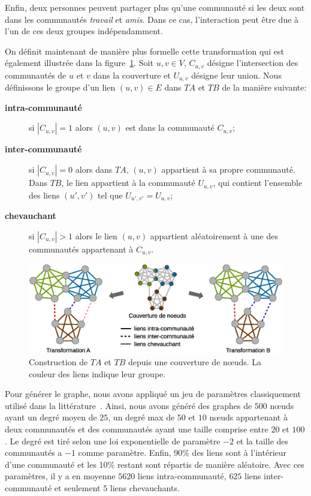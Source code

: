 Enfin, deux personnes peuvent partager plus qu'une communauté si les deux sont dans les communautés \emph{travail} et \emph{amis}.
Dans ce cas, l'interaction peut être due à l'un de ces deux groupes indépendamment.

On définit maintenant de manière plus formelle cette transformation qui est également illustrée dans la figure~\ref{fig:Trans}.
Soit $u,v \in V$, $C_{u,v}$ désigne l'intersection des communautés de $u$ et $v$ dans la couverture et $U_{u,v}$ désigne leur union.
Nous définissons le groupe d'un lien $(u,v) \in E$ dans $TA$ et $TB$ de la manière suivante:
\begin{description}
\item[\textbf{intra-communauté}] si $|C_{u,v}| = 1$ alors $(u,v)$ est dans la communauté $C_{u,v}$;
\item[\textbf{inter-communauté}] si $|C_{u,v}| = 0$ alors dans $TA$, $(u,v)$ appartient à sa propre communauté.
Dans $TB$, le lien appartient à la communauté $U_{u,v}$, qui contient l'ensemble des liens $(u',v')$ tel que $U_{u',v'}=U_{u,v}$;
\item[\textbf{chevauchant}] si $|C_{u,v}| > 1$ alors le lien $(u,v)$ appartient aléatoirement à une des communautés appartenant à $C_{u,v}$.
\end{description}

\begin{figure}
\centering
\includegraphics[width=0.9\linewidth]{img/ExpectedNodes/Example/GroundTruthTransformation}
\caption{Construction de $TA$ et $TB$ depuis une couverture de n\oe{}uds.
La couleur des liens indique leur groupe.}
\label{fig:Trans}
\end{figure}

Pour générer le graphe, nous avons appliqué un jeu de paramètres classiquement utilisé dans la littérature~\cite{Fortunato2010}.
Ainsi, nous avons généré des graphes de $500$ n\oe{}uds ayant un degré moyen de $25$, un degré max de $50$ et $10$ n\oe{}uds appartenant à deux communautés et des communautés ayant une taille comprise entre $20$ et $100$.
Le degré est tiré selon une loi exponentielle de paramètre $-2$ et la taille des communautés a $-1$ comme paramètre.
Enfin, 90\% des liens sont à l'intérieur d'une communauté et les 10\% restant sont répartis de manière aléatoire.
Avec ces paramètres, il y a en moyenne $5620$ liens intra-communauté, $625$ liens inter-communauté et seulement $5$ liens chevauchants.

